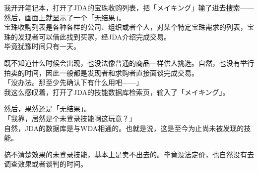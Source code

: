 我开开笔记本，打开了JDA的宝珠收购列表，把「メイキング」输了进去搜索——然后，画面上就显示了一个「无结果」。\\

宝珠收购列表是各种各样的公司、组织或者个人，对某个特定宝珠需求的列表，宝珠的发现者可以借此找到买家，经JDA介绍完成交易。\\

毕竟犹豫时间只有一天。

既不知道什么时候会出现，也没法像普通的商品一样供人挑选。自然，也没有举行拍卖的时间，因此一般都是发现者和求购者直接面谈完成交易。\\

「没办法。那至少先确认下有什么用吧——」\\

我这么感叹着，打开了JDA的技能数据库检索页，输入了「メイキング」。

然后，果然还是「无结果」。\\

「我靠，居然是个未登录技能啊这玩意？」\\

自然，JDA的数据库是与WDA相通的。也就是说，这是至今为止尚未被发现的技能。

搞不清楚效果的未登录技能，基本上是卖不出去的。毕竟没法定价，也自然没有去调查效果或者谈判的时间。\\

